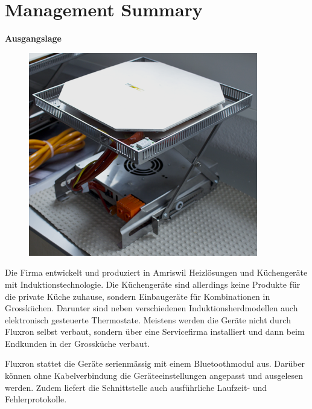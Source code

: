 \chapter*{Management Summary}

\textbf{Ausgangslage}

\begin{figure}
	\vspace{-0.5cm}
	\begin{center}
		\includegraphics[scale=1]{start/img/img_7680}
	\end{center}
	\vspace{-0.5cm}
\end{figure}

Die Firma \fluxron{} entwickelt und produziert in Amriswil Heizlösungen und Küchengeräte mit Induktionstechnologie. Die Küchengeräte sind allerdings keine Produkte für die private Küche zuhause, sondern Einbaugeräte für Kombinationen in Grossküchen. Darunter sind neben verschiedenen Induktionsherdmodellen auch elektronisch gesteuerte Thermostate. Meistens werden die Geräte nicht durch Fluxron selbst verbaut, sondern über eine Servicefirma installiert und dann beim Endkunden in der Grossküche verbaut.

Fluxron stattet die Geräte serienmässig mit einem Bluetoothmodul aus. Darüber können ohne Kabelverbindung die Geräteeinstellungen angepasst und ausgelesen werden. Zudem liefert die Schnittstelle auch ausführliche Laufzeit- und Fehlerprotokolle.

